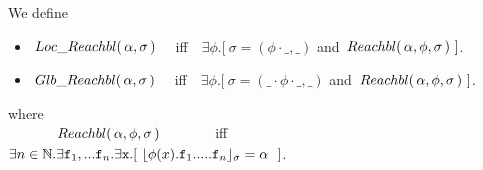 \begin{definition} We define 
\begin{itemize}
\item
$ \,Loc\_Reachbl(\,\alpha,\sigma\,) $ \ \ iff\ \  
$\exists \phi.[\ \sigma=(\phi\cdot\_, \_)$ and $\Relevant \alpha \phi \sigma\ ]$. %
\item
$\,Glb\_Reachbl(\,\alpha,\sigma\,)$  \ \ iff\ \  
$\exists \phi.[\ \sigma=(\_\cdot\phi\cdot\_, \_)$ and $\Relevant \alpha \phi \sigma\ ]$. %
\end{itemize}
where\\
$\strut\ \ \ \  \ \ \ \ \ \ \,Reachbl(\,\alpha,\phi,\sigma\,) $  \ \ \ \ \ \ \ iff\ \  
$\exists n\in \mathbb{N}.\exists \prg{f}_1,... \prg{f}_n.\exists \prg{x}.[ \ \interpret{\sigma}{\phi(x).\prg{f}_1.....\prg{f}_n} = \alpha \ \ ]$.

\end{definition}

